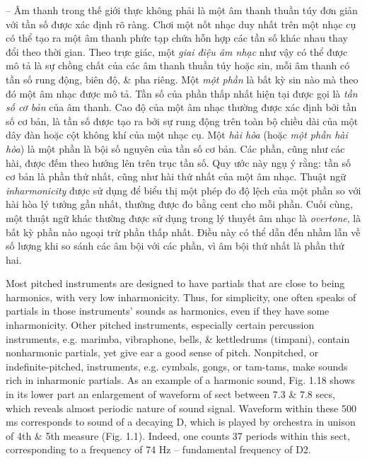 \documentclass{article}
\begin{document}
\begin{itemize}
\begin{itemize}
\begin{itemize}
			-- Âm thanh trong thế giới thực không phải là một âm thanh thuần túy đơn giản với tần số được xác định rõ ràng. Chơi một nốt nhạc duy nhất trên một nhạc cụ có thể tạo ra một âm thanh phức tạp chứa hỗn hợp các tần số khác nhau thay đổi theo thời gian. Theo trực giác, một {\it giai điệu âm nhạc} như vậy có thể được mô tả là sự chồng chất của các âm thanh thuần túy hoặc sin, mỗi âm thanh có tần số rung động, biên độ, \& pha riêng. Một {\it một phần} là bất kỳ sin nào mà theo đó một âm nhạc được mô tả. Tần số của phần thấp nhất hiện tại được gọi là {\it tần số cơ bản} của âm thanh. Cao độ của một âm nhạc thường được xác định bởi tần số cơ bản, là tần số được tạo ra bởi sự rung động trên toàn bộ chiều dài của một dây đàn hoặc cột không khí của một nhạc cụ. Một {\it hài hòa} (hoặc {\it một phần hài hòa}) là một phần là bội số nguyên của tần số cơ bản. Các phần, cũng như các hài, được đếm theo hướng lên trên trục tần số. Quy ước này ngụ ý rằng: tần số cơ bản là phần thứ nhất, cũng như hài thứ nhất của một âm nhạc. Thuật ngữ {\it inharmonicity} được sử dụng để biểu thị một phép đo độ lệch của một phần so với hài hòa lý tưởng gần nhất, thường được đo bằng cent cho mỗi phần. Cuối cùng, một thuật ngữ khác thường được sử dụng trong lý thuyết âm nhạc là {\it overtone}, là bất kỳ phần nào ngoại trừ phần thấp nhất. Điều này có thể dẫn đến nhầm lẫn về số lượng khi so sánh các âm bội với các phần, vì âm bội thứ nhất là phần thứ hai.
			
			Most pitched instruments are designed to have partials that are close to being harmonics, with very low inharmonicity. Thus, for simplicity, one often speaks of partials in those instruments' sounds as harmonics, even if they have some inharmonicity. Other pitched instruments, especially certain percussion instruments, e.g. marimba, vibraphone, bells, \& kettledrums (timpani), contain nonharmonic partials, yet give ear a good sense of pitch. Nonpitched, or indefinite-pitched, instruments, e.g. cymbals, gongs, or tam-tams, make sounds rich in inharmonic partials. As an example of a harmonic sound, {\sf Fig. 1.18} shows in its lower part an enlargement of waveform of sect between 7.3 \& 7.8 secs, which reveals almost periodic nature of sound signal. Waveform within these 500 ms corresponds to sound of a decaying D, which is played by orchestra in unison of 4th \& 5th measure ({\sf Fig. 1.1}). Indeed, one counts 37 periods within this sect, corresponding to a frequency of 74 Hz -- fundamental frequency of D2.
			

\end{itemize}
\end{itemize}
\end{itemize}
\end{document}
